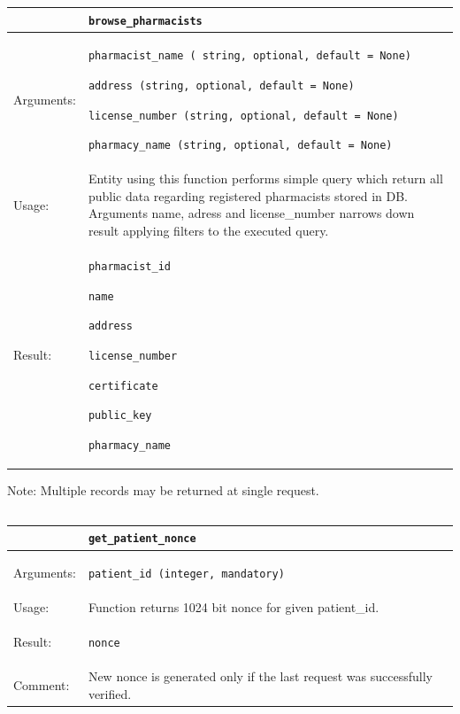     \begin{longtable}{| p{3cm} | p{10.75cm} |}
    \hline
     & \texttt{browse\_pharmacists} \\ \hline
    Arguments: &  \begin{packed_enum}
    	\item \texttt{pharmacist\_name ( string, optional, default = None)}
		\item \texttt{address (string, optional, default = None)}
		\item \texttt{license\_number (string, optional, default = None)}
		\item \texttt{pharmacy\_name (string, optional, default = None)}

	\end{packed_enum}     \\ \hline
    Usage: & Entity using this function performs simple query which return all public data regarding registered pharmacists stored in DB. Arguments name, adress and license\_number narrows down result applying filters to the executed query. \\ \hline
    Result: & \begin{packed_enum}
    	\item \texttt{pharmacist\_id}
		\item \texttt{name}
		\item \texttt{address}
		\item \texttt{license\_number}
		\item \texttt{certificate}
		\item \texttt{public\_key}
		\item \texttt{pharmacy\_name}
	\end{packed_enum}     \\ \hline	
    \end{longtable}
Note: Multiple records may be returned at single request.

\subsection{}


    \begin{longtable}{| p{3cm} | p{10.75cm} |}
    \hline
     & \texttt{get\_patient\_nonce} \\ \hline
    Arguments: &  \begin{packed_enum}
    	\item \texttt{patient\_id (integer, mandatory)}
	\end{packed_enum}     \\ \hline
    Usage: & Function returns 1024 bit nonce for given patient\_id. \\ \hline
    Result: & \begin{packed_enum}
    	\item \texttt{nonce}
	\end{packed_enum}     \\ \hline	
			Comment: & New nonce is generated only if the last request was successfully verified.\\ \hline
    \end{longtable}



